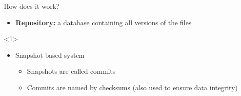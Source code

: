 \documentclass[usenames,svgnames,14pt]{beamer}
\begin{document}
\begin{frame}{How does it work?}
    \begin{overlayarea}{\textwidth}{0.75\textheight}
        \begin{itemize}
            \item \textbf{Repository:} a database containing all versions of the files
        \end{itemize}
        \begin{onlyenv}<1>
            \begin{center}
            \end{center}
        \end{onlyenv}
        \begin{itemize}[<2->]
            \item Snapshot-based system
                  \begin{itemize}
                      \item Snapshots are called commits
                      \item Commits are named by checksums (also used to ensure data integrity)\\

\end{itemize}
\end{itemize}
\end{overlayarea}
\end{frame}
\end{document}
